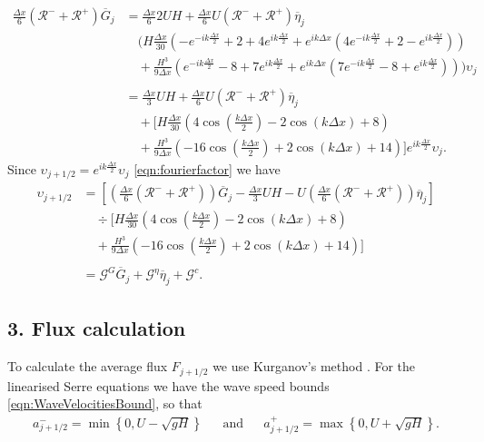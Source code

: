 \begin{align*}
\frac{\Delta x}{6} \left(\mathcal{R}^- + \mathcal{R}^+ \right)\overline{G}_{j} &= \frac{\Delta x}{6} 2UH   + \frac{\Delta x}{6} U \left(\mathcal{R}^- + \mathcal{R}^+ \right)\overline{\eta}_{j} \\ & \quad \Bigg(H\frac{\Delta x}{30} \left( -e^{-ik\frac{\Delta x}{2}} +  2 + 4e^{ik\frac{\Delta x}{2}} + e^{ik{\Delta x}}\left(4e^{-ik\frac{\Delta x}{2}} +  2 - e^{ik\frac{\Delta x}{2}}\right) \right)  \\ & \quad + \frac{H^3 }{9\Delta x} \left(  e^{-ik\frac{\Delta x}{2}} -8 + 7e^{ik\frac{\Delta x}{2}}  + e^{ik{\Delta x}}\left(7e^{-ik\frac{\Delta x}{2}} -8 + e^{ik\frac{\Delta x}{2}}  \right)  \right)   \Bigg) \upsilon_j
 \\ \\ &= \frac{\Delta x}{3}UH   + \frac{\Delta x}{6} U \left(\mathcal{R}^- + \mathcal{R}^+ \right)\overline{\eta}_{j}  \\ & \quad +  \Bigg[H\frac{\Delta x}{30} \left( 4\cos\left(\frac{k \Delta x}{2}\right) - 2\cos\left({k \Delta x}\right) + 8\right)   \\ & \quad + \frac{H^3 }{9\Delta x} \left(-16\cos\left(\frac{k\Delta x}{2}\right) + 2 \cos\left(k \Delta x\right) + 14\right) \Bigg]e^{i k \frac{\Delta x}{2}} \upsilon_{j}.
\end{align*}
Since $\upsilon_{j+1/2} = e^{i k \frac{\Delta x}{2}} \upsilon_{j} $ \eqref{eqn:fourierfactor} we have 
\begin{align}
\label{eqn:2ndFEMutoG}
\upsilon_{j+1/2} &=  \left[\left(\frac{\Delta x}{6} \left(\mathcal{R}^- + \mathcal{R}^+ \right)\right)  \overline{G}_{j}  - \frac{\Delta x}{3}UH - U\left(\frac{\Delta x}{6} \left(\mathcal{R}^- + \mathcal{R}^+ \right)\right)  \overline{\eta}_{j}   \right] \nonumber\\
& \quad  \div  \Bigg[H\frac{\Delta x}{30} \left( 4\cos\left(\frac{k \Delta x}{2}\right) - 2\cos\left({k \Delta x}\right) + 8\right)  \nonumber\\ & \quad + \frac{H^3 }{9\Delta x}\left(-16\cos\left(\frac{k\Delta x}{2}\right) + 2 \cos\left(k \Delta x\right) + 14\right)    \Bigg]
\nonumber \\ \nonumber\\ &=  \mathcal{G}^G \overline{G}_{j} + \mathcal{G}^{\eta} \overline{\eta}_{j} + \mathcal{G}^c .
\end{align}
 

\subsection{3. Flux calculation}
To calculate the average flux $F_{j+1/2}$ we use Kurganov's method \cite{Kurganov-etal-2001-707}. For the linearised Serre equations we have the wave speed bounds \eqref{eqn:WaveVelocitiesBound}, so that
\begin{align}
a^-_{j+ 1/2} = \min \left\lbrace 0,  U - \sqrt{g H} \right \rbrace& &\text{and}& &a^+_{j+ 1/2} =  \max \left\lbrace 0, U + \sqrt{g H} \right \rbrace .
\label{eqn:wavespeedboundslinSerre}
\end{align}

